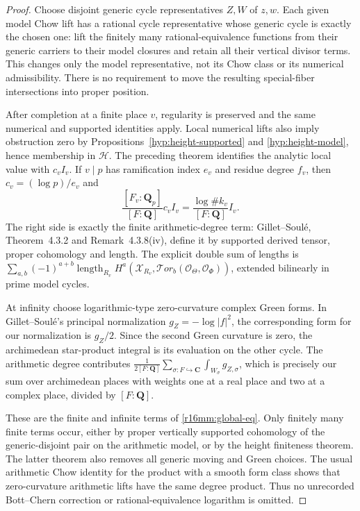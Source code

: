 \documentclass[11pt,a4paper]{article}
\theoremstyle{definition}
\theoremstyle{remark}
\numberwithin{equation}{section}
\begin{document}
\begin{proof}
Choose disjoint generic cycle representatives $Z,W$ of $z,w$.
Each given model Chow lift has a rational cycle representative
whose generic cycle is exactly the chosen one: lift the finitely
many rational-equivalence functions from their generic carriers
to their model closures and retain all their vertical divisor
terms. This changes only the model representative, not its
Chow class or its numerical admissibility. There is no requirement
to move the resulting special-fiber intersections into proper
position.

After completion at a finite place $v$, regularity is preserved
and the same numerical and supported identities apply. Local
numerical lifts also imply obstruction zero by
Propositions~\ref{hyp:height-supported} and \ref{hyp:height-model}, hence membership in $\mathcal H$. The preceding
theorem identifies the analytic local value with $c_v I_v$.
If $v\mid p$ has ramification index $e_v$ and residue degree
$f_v$, then $c_v=(\log p)/e_v$ and
\[
 \frac{[F_v:\mathbf Q_p]}{[F:\mathbf Q]}c_v I_v
             =\frac{\log\#k_v}{[F:\mathbf Q]}I_v.
 \tag{MM16.11}\label{r16mm:weight}
\]
The right side is exactly the finite arithmetic-degree term:
Gillet--Soul\'e, Theorem~4.3.2 and Remark~4.3.8(iv), define it
by supported derived tensor, proper cohomology and length.
The explicit double sum of lengths is
$\sum_{a,b}(-1)^{a+b}\operatorname{length}_{R_v}
H^a(\mathcal X_{R_v},\mathcal{T}or_b(\mathcal O_{\Theta},
\mathcal O_{\Phi}))$, extended bilinearly in prime model cycles.

At infinity choose logarithmic-type zero-curvature complex
Green forms. In Gillet--Soul\'e's principal normalization
$g_Z=-\log|f|^2$, the corresponding form for our normalization
is $g_Z/2$. Since the second Green curvature is zero, the
archimedean star-product integral is its evaluation on the
other cycle. The arithmetic degree contributes
$\frac1{2[F:\mathbf Q]}\sum_{\sigma:F\hookrightarrow\mathbf C}
\int_{W_\sigma}g_{Z,\sigma}$, which is precisely our sum over
archimedean places with weights one at a real place and two
at a complex place, divided by $[F:\mathbf Q]$.

These are the finite and infinite terms of
\eqref{r16mm:global-eq}. Only finitely many finite terms occur,
either by proper vertically supported cohomology of the
generic-disjoint pair on the arithmetic model, or by the
height finiteness theorem. The latter theorem
also removes all generic moving and Green choices. The usual
arithmetic Chow identity for the product with a smooth form
class shows that zero-curvature arithmetic lifts have the
same degree product. Thus no unrecorded Bott--Chern correction
or rational-equivalence logarithm is omitted.
\end{proof}
\end{document}
